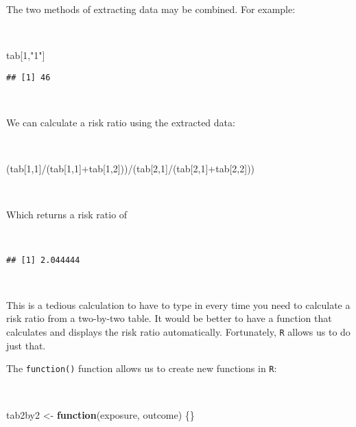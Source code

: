 \documentclass[
  12pt,
  a4paper]{book}
\newenvironment{Shaded}{\begin{snugshade}}{\end{snugshade}}
\newcommand{\ControlFlowTok}[1]{\textcolor[rgb]{0.13,0.29,0.53}{\textbf{#1}}}
\newcommand{\DecValTok}[1]{\textcolor[rgb]{0.00,0.00,0.81}{#1}}
\newcommand{\NormalTok}[1]{#1}
\newcommand{\OtherTok}[1]{\textcolor[rgb]{0.56,0.35,0.01}{#1}}
\newcommand{\SpecialCharTok}[1]{\textcolor[rgb]{0.00,0.00,0.00}{#1}}
\newcommand{\StringTok}[1]{\textcolor[rgb]{0.31,0.60,0.02}{#1}}
\begin{document}
\newpage

The two methods of extracting data may be combined. For example:

~

\begin{Shaded}
\begin{Highlighting}[]
\NormalTok{tab[}\DecValTok{1}\NormalTok{,}\StringTok{"1"}\NormalTok{]}
\end{Highlighting}
\end{Shaded}

\begin{verbatim}
## [1] 46
\end{verbatim}

~

We can calculate a risk ratio using the extracted data:

~

\begin{Shaded}
\begin{Highlighting}[]
\NormalTok{(tab[}\DecValTok{1}\NormalTok{,}\DecValTok{1}\NormalTok{]}\SpecialCharTok{/}\NormalTok{(tab[}\DecValTok{1}\NormalTok{,}\DecValTok{1}\NormalTok{]}\SpecialCharTok{+}\NormalTok{tab[}\DecValTok{1}\NormalTok{,}\DecValTok{2}\NormalTok{]))}\SpecialCharTok{/}\NormalTok{(tab[}\DecValTok{2}\NormalTok{,}\DecValTok{1}\NormalTok{]}\SpecialCharTok{/}\NormalTok{(tab[}\DecValTok{2}\NormalTok{,}\DecValTok{1}\NormalTok{]}\SpecialCharTok{+}\NormalTok{tab[}\DecValTok{2}\NormalTok{,}\DecValTok{2}\NormalTok{]))}
\end{Highlighting}
\end{Shaded}

~

Which returns a risk ratio of

~

\begin{verbatim}
## [1] 2.044444
\end{verbatim}

~

This is a tedious calculation to have to type in every time you need to calculate a risk ratio from a two-by-two table. It would be better to have a function that calculates and displays the risk ratio automatically. Fortunately, \texttt{R} allows us to do just that.

The \texttt{function()} function allows us to create new functions in \texttt{R}:

~

\begin{Shaded}
\begin{Highlighting}[]
\NormalTok{tab2by2 }\OtherTok{\textless{}{-}} \ControlFlowTok{function}\NormalTok{(exposure, outcome) \{\}}
\end{Highlighting}
\end{Shaded}
\end{document}
